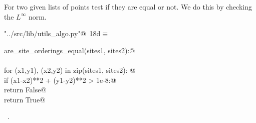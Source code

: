 \documentclass[11.5pt]{report}
\begin{document}
\vspace{-0.8cm}
\newchunk For two given lists of points test if they are 
equal or not. We do this by checking the $L^{\infty}$ norm.
\begin{flushleft} \small
\begin{minipage}{\linewidth}\label{scrap17}\raggedright\small
{} \verb@"../src/lib/utils_algo.py"@\nobreak\ {\footnotesize {18d}}$\equiv$
\vspace{-1ex}
\begin{list}{}{} \item
\mbox{}\verb@def are_site_orderings_equal(sites1, sites2):@\\
\mbox{}\verb@@\\
\mbox{}\verb@    for (x1,y1), (x2,y2) in zip(sites1, sites2): @\\
\mbox{}\verb@        if (x1-x2)**2 + (y1-y2)**2 > 1e-8:@\\
\mbox{}\verb@            return False@\\
\mbox{}\verb@    return True@\\
\mbox{}\verb@@{\NWsep}
\end{list}
\vspace{-1.5ex}
\footnotesize
\begin{list}{}{\setlength{\itemsep}{-\parsep}\setlength{\itemindent}{-\leftmargin}}
\item \NWtxtFileDefBy\ .

\item{}
\end{list}
\end{minipage}\vspace{4ex}
\end{flushleft}
\end{document}
